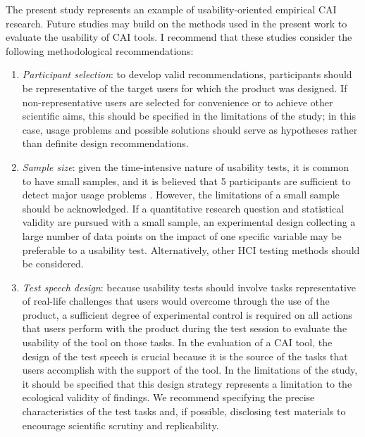 The present study represents an example of usability-oriented empirical CAI research. Future studies may build on the methods used in the present work to evaluate the usability of CAI tools. I recommend that these studies consider the following methodological recommendations:
\begin{enumerate}
\item \begin{sloppypar}\textit{Participant selection}: to develop valid recommendations, participants should be representative of the target users for which the product was designed. If non-representative users are selected for convenience or to achieve other scientific aims, this should be specified in the limitations of the study; in this case, usage problems and possible solutions should serve as hypotheses rather than definite design recommendations.\end{sloppypar}
\item \textit{Sample size}: given the time-intensive nature of usability tests, it is common to have small samples, and it is believed that 5 participants are sufficient to detect major usage problems \citep{barnum2020usability,nielsen1993mathematical}. However, the limitations of a small sample should be acknowledged. If a quantitative research question and statistical validity are pursued with a small sample, an experimental design collecting a large number of data points on the impact of one specific variable may be preferable to a usability test. Alternatively, other HCI testing methods should be considered.
\item \textit{Test speech design}: because usability tests should involve tasks representative of real-life challenges that users would overcome through the use of the product, a sufficient degree of experimental control is required on all actions that users perform with the product during the test session to evaluate the usability of the tool on those tasks. In the evaluation of a CAI tool, the design of the test speech is crucial because it is the source of the tasks that users accomplish with the support of the tool. In the limitations of the study, it should be specified that this design strategy represents a limitation to the ecological validity of findings. We recommend specifying the precise characteristics of the test tasks and, if possible, disclosing test materials to encourage scientific scrutiny and replicability.

\end{enumerate}
